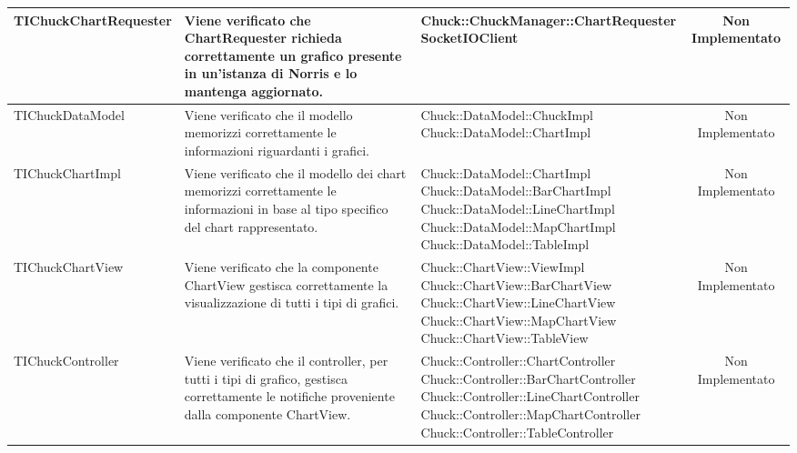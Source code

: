 \begin{table}[H]
\begin{center}
\begin{longtabu}{| X | X | X | c |}
	TIChuckChartRequester
				&
Viene verificato che ChartRequester richieda correttamente un grafico presente in un'istanza di Norris e lo mantenga aggiornato.
			& \parbox[t]{0.4\textwidth}{
Chuck::ChuckManager::ChartRequester\\
SocketIOClient}
			& Non Implementato
			\\ \hline



	TIChuckDataModel
				&
Viene verificato che il modello memorizzi correttamente le informazioni riguardanti i grafici.
			& \parbox[t]{0.4\textwidth}{
Chuck::DataModel::ChuckImpl\\
Chuck::DataModel::ChartImpl}
			& Non Implementato
			\\ \hline



	TIChuckChartImpl
				&
Viene verificato che il modello dei chart memorizzi correttamente le informazioni in base al tipo specifico del chart rappresentato.
			& \parbox[t]{0.4\textwidth}{
Chuck::DataModel::ChartImpl\\
Chuck::DataModel::BarChartImpl\\
Chuck::DataModel::LineChartImpl\\
Chuck::DataModel::MapChartImpl\\
Chuck::DataModel::TableImpl}
			& Non Implementato
			\\ \hline



	TIChuckChartView
				&
Viene verificato che la componente ChartView gestisca correttamente la visualizzazione di tutti i tipi di grafici.
			& \parbox[t]{0.4\textwidth}{
Chuck::ChartView::ViewImpl\\
Chuck::ChartView::BarChartView\\
Chuck::ChartView::LineChartView\\
Chuck::ChartView::MapChartView\\
Chuck::ChartView::TableView}
			& Non Implementato
			\\ \hline



	TIChuckController
				&
Viene verificato che il controller, per tutti i tipi di grafico, gestisca correttamente le notifiche proveniente dalla componente ChartView.
			& \parbox[t]{0.4\textwidth}{
Chuck::Controller::ChartController\\
Chuck::Controller::BarChartController\\
Chuck::Controller::LineChartController\\
Chuck::Controller::MapChartController\\
Chuck::Controller::TableController}
			& Non Implementato
			\\ \hline




\end{longtabu}
\end{center}
\end{table}
